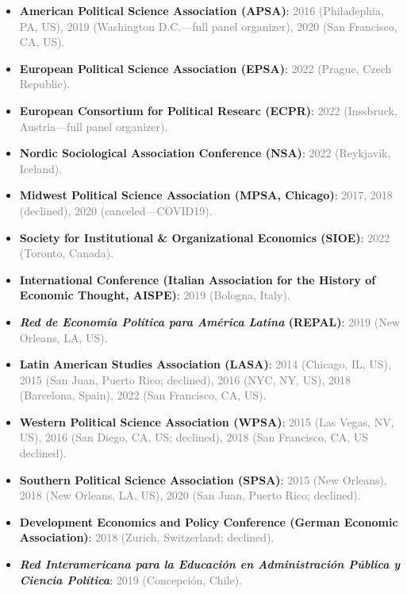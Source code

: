\begin{itemize}
\item[\textcolor{gray}{\textbullet}] {\bf American Political Science Association (APSA)}: \textcolor{gray}{2016 (Philadephia, PA, US), 2019 (Washington D.C.---full panel organizer), 2020 (San Francisco, CA, US).}
\item[\textcolor{gray}{\textbullet}] {\bf European Political Science Association (EPSA)}: \textcolor{gray}{2022 (Prague, Czech Republic).}
\item[\textcolor{gray}{\textbullet}] {\bf European Consortium for Political Researc (ECPR)}: \textcolor{gray}{2022 (Inssbruck, Austria---full panel organizer).}
\item[\textcolor{gray}{\textbullet}] {\bf Nordic Sociological Association Conference (NSA)}: \textcolor{gray}{2022 (Reykjavik, Iceland).}
\item[\textcolor{gray}{\textbullet}] {\bf Midwest Political Science Association (MPSA, Chicago)}: \textcolor{gray}{2017, 2018 (declined), 2020 (canceled---COVID19).}
\item[\textcolor{gray}{\textbullet}] {\bf Society for Institutional \& Organizational Economics (SIOE)}: \textcolor{gray}{2022 (Toronto, Canada).}
\item[\textcolor{gray}{\textbullet}] {\bf International Conference (Italian Association for the History of Economic Thought, AISPE)}: \textcolor{gray}{2019 (Bologna, Italy).}
\item[\textcolor{gray}{\textbullet}] {\bf \emph{Red de Econom\'ia Pol\'itica para Am\'erica Latina} (REPAL)}: \textcolor{gray}{2019 (New Orleans, LA, US).}
\item[\textcolor{gray}{\textbullet}] {\bf Latin American Studies Association (LASA)}: \textcolor{gray}{2014 (Chicago, IL, US), 2015 (San Juan, Puerto Rico; declined), 2016 (NYC, NY, US), 2018 (Barcelona, Spain), 2022 (San Francisco, CA, US).}
\item[\textcolor{gray}{\textbullet}] {\bf Western Political Science Association (WPSA)}: \textcolor{gray}{2015 (Las Vegas, NV, US), 2016 (San Diego, CA, US; declined), 2018 (San Francisco, CA, US declined).}
\item[\textcolor{gray}{\textbullet}] {\bf Southern Political Science Association (SPSA)}: \textcolor{gray}{2015 (New Orleans), 2018 (New Orleans, LA, US), 2020 (San Juan, Puerto Rico; declined).}
\item[\textcolor{gray}{\textbullet}] {\bf Development Economics and Policy Conference (German Economic Association)}: \textcolor{gray}{2018 (Zurich, Switzerland; declined).}
\item[\textcolor{gray}{\textbullet}] {\bf \emph{Red Interamericana para la Educaci\'on en Administraci\'on P\'ublica y Ciencia Pol\'itica}}: \textcolor{gray}{2019 (Concepci\'on, Chile).}
\end{itemize}
